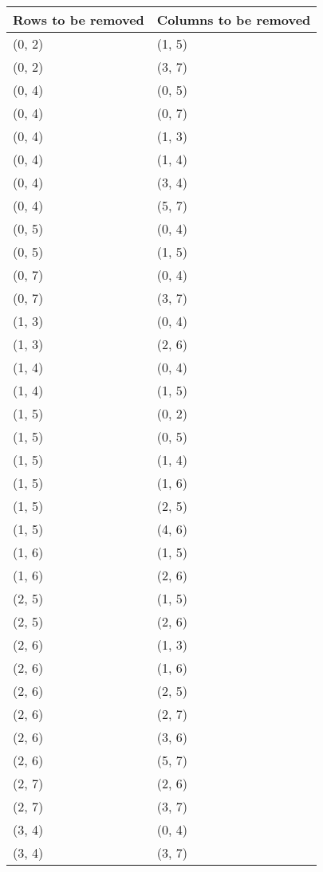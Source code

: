 \begin{footnotesize}
\begin{longtable}[c]{|l|l|}
\hline
\textbf{Rows to be removed} & \textbf{Columns to be removed} \\ \hline
\endfirsthead
\endhead
(0, 2)
&(1, 5)
\\ \hline
(0, 2)
&(3, 7)
\\ \hline
(0, 4)
&(0, 5)
\\ \hline
(0, 4)
&(0, 7)
\\ \hline
(0, 4)
&(1, 3)
\\ \hline
(0, 4)
&(1, 4)
\\ \hline
(0, 4)
&(3, 4)
\\ \hline
(0, 4)
&(5, 7)
\\ \hline
(0, 5)
&(0, 4)
\\ \hline
(0, 5)
&(1, 5)
\\ \hline
(0, 7)
&(0, 4)
\\ \hline
(0, 7)
&(3, 7)
\\ \hline
(1, 3)
&(0, 4)
\\ \hline
(1, 3)
&(2, 6)
\\ \hline
(1, 4)
&(0, 4)
\\ \hline
(1, 4)
&(1, 5)
\\ \hline
(1, 5)
&(0, 2)
\\ \hline
(1, 5)
&(0, 5)
\\ \hline
(1, 5)
&(1, 4)
\\ \hline
(1, 5)
&(1, 6)
\\ \hline
(1, 5)
&(2, 5)
\\ \hline
(1, 5)
&(4, 6)
\\ \hline
(1, 6)
&(1, 5)
\\ \hline
(1, 6)
&(2, 6)
\\ \hline
(2, 5)
&(1, 5)
\\ \hline
(2, 5)
&(2, 6)
\\ \hline
(2, 6)
&(1, 3)
\\ \hline
(2, 6)
&(1, 6)
\\ \hline
(2, 6)
&(2, 5)
\\ \hline
(2, 6)
&(2, 7)
\\ \hline
(2, 6)
&(3, 6)
\\ \hline
(2, 6)
&(5, 7)
\\ \hline
(2, 7)
&(2, 6)
\\ \hline
(2, 7)
&(3, 7)
\\ \hline
(3, 4)
&(0, 4)
\\ \hline
(3, 4)
&(3, 7)
\\ \hline

\end{longtable}
\end{footnotesize}
